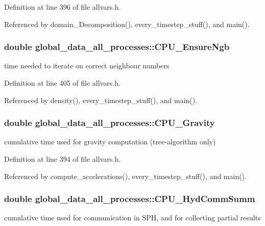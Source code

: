 Definition at line 396 of file allvars.h.



Referenced by domain\_\-Decomposition(), every\_\-timestep\_\-stuff(), and main().

\hypertarget{structglobal__data__all__processes_ad3447593858d4165b669b5e70b2521cd}{
\subsubsection[{CPU\_\-EnsureNgb}]{\setlength{\rightskip}{0pt plus 5cm}double {\bf global\_\-data\_\-all\_\-processes::CPU\_\-EnsureNgb}}}
\label{structglobal__data__all__processes_ad3447593858d4165b669b5e70b2521cd}
time needed to iterate on correct neighbour numbers 

Definition at line 405 of file allvars.h.



Referenced by density(), every\_\-timestep\_\-stuff(), and main().

\hypertarget{structglobal__data__all__processes_a27dce58feba6ff0e933ed6f24f857168}{
\subsubsection[{CPU\_\-Gravity}]{\setlength{\rightskip}{0pt plus 5cm}double {\bf global\_\-data\_\-all\_\-processes::CPU\_\-Gravity}}}
\label{structglobal__data__all__processes_a27dce58feba6ff0e933ed6f24f857168}
cumulative time used for gravity computation (tree-\/algorithm only) 

Definition at line 394 of file allvars.h.



Referenced by compute\_\-accelerations(), every\_\-timestep\_\-stuff(), and main().

\hypertarget{structglobal__data__all__processes_ad03842fb23d3c15316ca07c7ac1bce27}{
\subsubsection[{CPU\_\-HydCommSumm}]{\setlength{\rightskip}{0pt plus 5cm}double {\bf global\_\-data\_\-all\_\-processes::CPU\_\-HydCommSumm}}}
\label{structglobal__data__all__processes_ad03842fb23d3c15316ca07c7ac1bce27}
cumulative time used for communication in SPH, and for collecting partial results 

